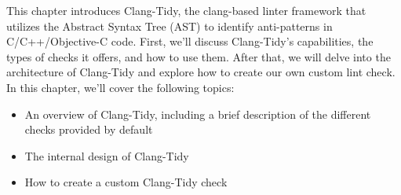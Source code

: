

This chapter introduces Clang-Tidy, the clang-based linter framework that utilizes the Abstract Syntax Tree (AST) to identify anti-patterns in C/C++/Objective-C code. First, we'll discuss Clang-Tidy's capabilities, the types of checks it offers, and how to use them. After that, we will delve into the architecture of Clang-Tidy and explore how to create our own custom lint check. In this chapter, we'll cover the following topics:

\begin{itemize}
\item
An overview of Clang-Tidy, including a brief description of the different checks provided by default

\item
The internal design of Clang-Tidy

\item
How to create a custom Clang-Tidy check
\end{itemize}